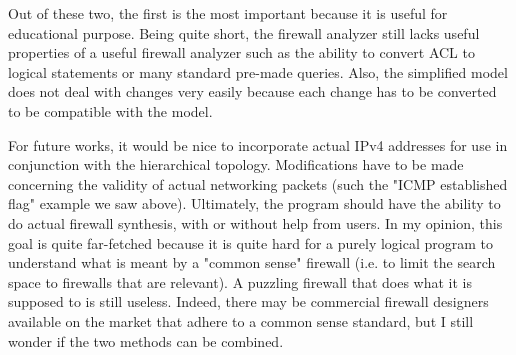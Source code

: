 Out of these two, the first is the most important because it is useful for educational purpose. Being quite short, the firewall analyzer still lacks useful properties of a useful firewall analyzer such as the ability to convert ACL to logical statements or many standard pre-made queries. Also, the simplified model does not deal with changes very easily because each change has to be converted to be compatible with the model.

For future works, it would be nice to incorporate actual IPv4 addresses for use in conjunction with the hierarchical topology. Modifications have to be made concerning the validity of actual networking packets (such the "ICMP established flag" example we saw above). Ultimately, the program should have the ability to do actual firewall synthesis, with or without help from users. In my opinion, this goal is quite far-fetched because it is quite hard for a purely logical program to understand what is meant by a "common sense" firewall (i.e. to limit the search space to firewalls that are relevant). A puzzling firewall that does what it is supposed to is still useless. Indeed, there may be commercial firewall designers available on the market that adhere to a common sense standard, but I still wonder if the two methods can be combined.
\fi